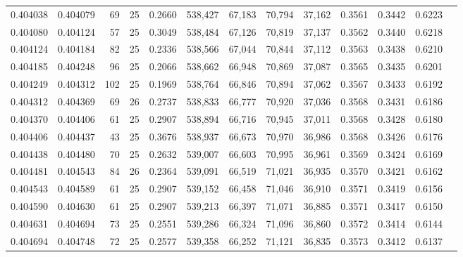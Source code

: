 \begin{tabular}{rrrrrrrrrrrrr}
0.404038 & 0.404079 &    69 &  25 &                                     0.2660 & 538,427 &  67,183 &  70,794 &  37,162 & 0.3561 & 0.3442 & 0.6223 \\
0.404080 & 0.404124 &    57 &  25 &                                     0.3049 & 538,484 &  67,126 &  70,819 &  37,137 & 0.3562 & 0.3440 & 0.6218 \\
0.404124 & 0.404184 &    82 &  25 &                                     0.2336 & 538,566 &  67,044 &  70,844 &  37,112 & 0.3563 & 0.3438 & 0.6210 \\
0.404185 & 0.404248 &    96 &  25 &                                     0.2066 & 538,662 &  66,948 &  70,869 &  37,087 & 0.3565 & 0.3435 & 0.6201 \\
0.404249 & 0.404312 &   102 &  25 &                                     0.1969 & 538,764 &  66,846 &  70,894 &  37,062 & 0.3567 & 0.3433 & 0.6192 \\
0.404312 & 0.404369 &    69 &  26 &                                     0.2737 & 538,833 &  66,777 &  70,920 &  37,036 & 0.3568 & 0.3431 & 0.6186 \\
0.404370 & 0.404406 &    61 &  25 &                                     0.2907 & 538,894 &  66,716 &  70,945 &  37,011 & 0.3568 & 0.3428 & 0.6180 \\
0.404406 & 0.404437 &    43 &  25 &                                     0.3676 & 538,937 &  66,673 &  70,970 &  36,986 & 0.3568 & 0.3426 & 0.6176 \\
0.404438 & 0.404480 &    70 &  25 &                                     0.2632 & 539,007 &  66,603 &  70,995 &  36,961 & 0.3569 & 0.3424 & 0.6169 \\
0.404481 & 0.404543 &    84 &  26 &                                     0.2364 & 539,091 &  66,519 &  71,021 &  36,935 & 0.3570 & 0.3421 & 0.6162 \\
0.404543 & 0.404589 &    61 &  25 &                                     0.2907 & 539,152 &  66,458 &  71,046 &  36,910 & 0.3571 & 0.3419 & 0.6156 \\
0.404590 & 0.404630 &    61 &  25 &                                     0.2907 & 539,213 &  66,397 &  71,071 &  36,885 & 0.3571 & 0.3417 & 0.6150 \\
0.404631 & 0.404694 &    73 &  25 &                                     0.2551 & 539,286 &  66,324 &  71,096 &  36,860 & 0.3572 & 0.3414 & 0.6144 \\
0.404694 & 0.404748 &    72 &  25 &                                     0.2577 & 539,358 &  66,252 &  71,121 &  36,835 & 0.3573 & 0.3412 & 0.6137 \\

\end{tabular}
